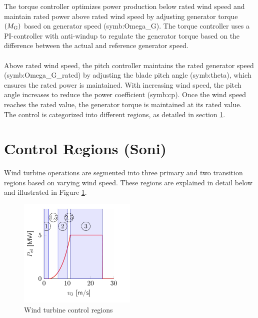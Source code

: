 The torque controller optimizes power production below rated wind speed and maintain rated power above rated wind speed by adjusting generator torque $(M_\textnormal{G})$ based on generator speed (\gls{symb:Omega_G}).
The torque controller uses a PI-controller with anti-windup to regulate the generator torque based on the difference between the actual and reference generator speed.
\\
\\
Above rated wind speed, the pitch controller maintains the rated generator speed (\gls{symb:Omega_G_rated}) by adjusting the blade pitch angle (\gls{symb:theta}), which ensures the rated power is maintained.
With increasing wind speed, the pitch angle increases to reduce the power coefficient (\gls{symb:cp}).
Once the wind speed reaches the rated value, the generator torque is maintained at its rated value.
The control is categorized into different regions, as detailed in section \ref{control regions}.
\section{Control Regions (Soni)} \label{control regions}

Wind turbine operations are segmented into three primary and two transition regions based on varying wind speed. These regions are explained in detail below and illustrated in Figure \ref{fig:control regions}.

\begin{figure}[h]
	\centering
	\includegraphics[width=0.5\textwidth]{Figures/Figure_2.jpg}
	\caption{Wind turbine control regions \cite{SchlipfLecture}}
	\label{fig:control regions} 
\end{figure}

